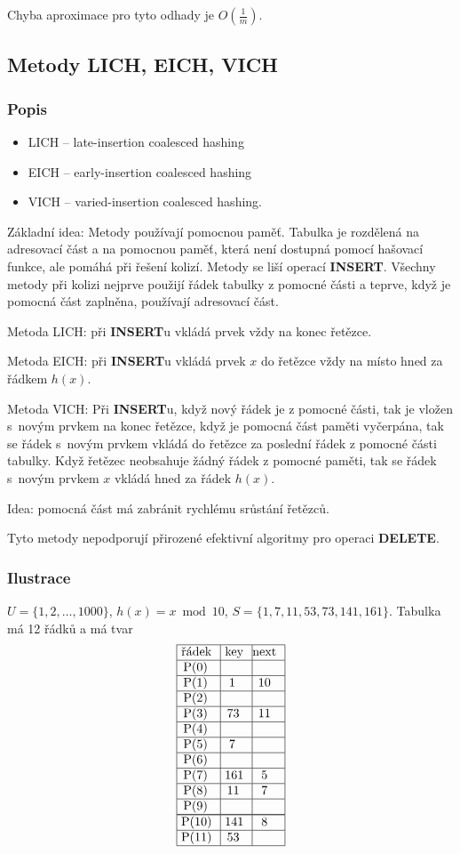 \documentclass[a4paper,12pt]{article}
\begin{document}
Chyba aproximace 
pro tyto odhady je $O(\frac 1m)$. 

\subsection{Metody LICH, EICH, VICH}

\subsubsection{Popis}
\begin{itemize}
\item LICH -- late-insertion coalesced hashing 
\item EICH -- early-insertion coalesced hashing 
\item VICH -- varied-insertion coalesced hashing.
\end{itemize}

Základní idea: Metody používají pomocnou paměť. 
Tabulka je rozdělená na adresovací část a na pomocnou 
paměť, která není dostupná pomocí hašovací funkce, 
ale pomáhá při řešení kolizí. Metody se liší operací 
{\bf INSERT}. Všechny metody při kolizi nejprve použijí řádek 
tabulky z pomocné části a teprve, když je pomocná část 
zaplněna, používají adresovací část.
 
Metoda LICH: při {\bf INSERT}u vkládá prvek vždy na konec 
ře\-těz\-ce.
 
Metoda EICH: při {\bf INSERT}u vkládá prvek $x$ do řetězce vždy 
na místo hned za řádkem $h(x)$.
 
Metoda VICH: Při {\bf INSERT}u, když nový řádek je z 
pomocné části, tak je vložen s~novým prvkem na konec 
řetězce, když je pomocná část paměti vyčer\-pá\-na, tak se 
řádek s~novým prvkem vkládá do řetězce za posled\-ní 
řádek z pomocné části tabulky. Když řetězec neobsahuje 
žádný řádek z pomocné paměti, tak se řádek s~novým  prvkem $
x$ vkládá hned za řádek $h(x)$. 

Idea: pomocná část má zabránit rychlému 
srůstání řetězců.

Tyto metody nepodporují přirozené efektivní algoritmy 
pro ope\-raci {\bf DELETE}.

\subsubsection{Ilustrace} $U=\{1,2,\dots,1000\}$, $h(x)=x\bmod10$,\newline 
$S=\{1,7,11,53,73,141,161\}$. Tabulka má 12 řádků a 
má tvar
$$\vtop{\offinterlineskip\halign {\strut\vrule\ # & \vrule\ # & \vrule \hfil # \hfil \vrule\cr\noalign{\hrule}řádek & key & next \hfil \cr\noalign{\hrule}P(0) & &\hfill \cr\noalign{\hrule}P(1) & 1 & 10 \cr\noalign{\hrule}P(2) & &\hfill \cr\noalign{\hrule}P(3) & 73 & 11 \cr\noalign{\hrule}P(4) &  &\hfill \cr\noalign{\hrule}P(5) & 7 & \hfill \cr\noalign{\hrule}P(6) & &\hfill \cr\noalign{\hrule}P(7) & 161 & 5 \cr\noalign{\hrule}P(8) & 11 & 7 \cr\noalign{\hrule}P(9) & &\hfill \cr\noalign{\hrule}\noalign{\hrule}P(10) & 141 & 8 \cr\noalign{\hrule}P(11) & 53 & \cr\noalign{\hrule}}}$$
\end{document}
